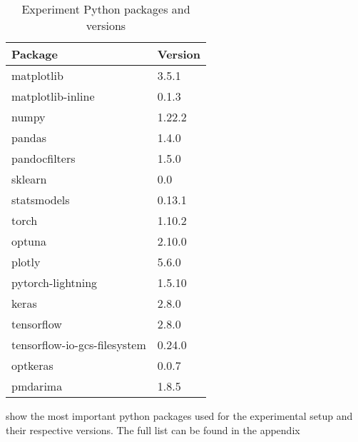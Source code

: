 \begin{table}[h]
  \centering
  \caption{Experiment Python packages and versions}
  \label{table:python-packages-most-important}
  \begin{tabular}{|l|l|}\hline
    Package                      & Version \\ \hline
    \hline
    matplotlib                   & 3.5.1   \\
    matplotlib-inline            & 0.1.3   \\
    numpy                        & 1.22.2  \\
    pandas                       & 1.4.0   \\
    pandocfilters                & 1.5.0   \\
    sklearn                      & 0.0     \\
    statsmodels                  & 0.13.1  \\
    torch                        & 1.10.2  \\
    optuna                       & 2.10.0  \\
    plotly                       & 5.6.0   \\
    pytorch-lightning            & 1.5.10  \\
    keras                        & 2.8.0   \\
    tensorflow                   & 2.8.0   \\
    tensorflow-io-gcs-filesystem & 0.24.0  \\
    optkeras                     & 0.0.7   \\
    pmdarima                     & 1.8.5   \\
    \hline
  \end{tabular}
\end{table}
 show the most important
python packages used for the experimental setup and their respective versions.
The full list can be found in the appendix

